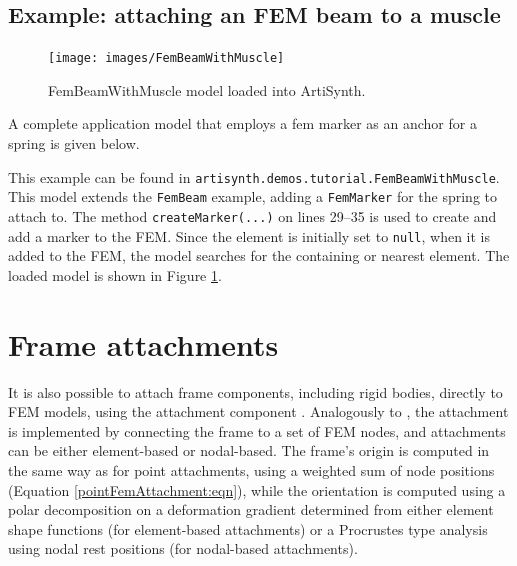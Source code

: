 \subsection{Example: attaching an FEM beam to a muscle}

\begin{figure}[ht]
	\centering
	\texttt{[image: images/FemBeamWithMuscle]}
	\caption{FemBeamWithMuscle model loaded into ArtiSynth.}
	\label{fig:fem:beamwithmuscle}
\end{figure}

A complete application model that employs a fem marker as an anchor for a spring
is given below.
\lstset{numbers=left}

\lstset{numbers=none}
This example can be found in {\tt artisynth.demos.tutorial.FemBeamWithMuscle}.
This model extends the {\tt FemBeam} example, adding a {\tt FemMarker} for the
spring to attach to.  The method {\tt createMarker(...)} on lines 29--35
is used to create and add a marker to the FEM.  Since the element is initially
set to {\tt null}, when it is added to the FEM, the model searches for the
containing or nearest element.  The loaded model is shown in Figure 
\ref{fig:fem:beamwithmuscle}.


\section{Frame attachments}
\label{sec:fem:frameattachments}

It is also possible to attach frame components, including rigid
bodies, directly to FEM models, using the attachment component
.
Analogously to
, the
attachment is implemented by connecting the frame to a set of FEM
nodes, and attachments can be either element-based or nodal-based.  The
frame's origin is computed in the same way as for point attachments,
using a weighted sum of node positions (Equation
\ref{pointFemAttachment:eqn}), while the orientation is computed using
a polar decomposition on a deformation gradient determined from either
element shape functions (for element-based attachments) or a
Procrustes type analysis using nodal rest positions (for nodal-based attachments).

